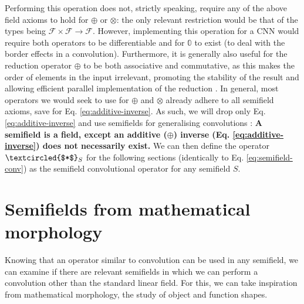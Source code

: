 \documentclass[a4paper, 12pt]{report}
\begin{document}
Performing this operation does not, strictly speaking, require any of the above field axioms to hold for $\oplus$ or $\otimes$: the only relevant restriction would be that of the types being $\mathcal{F}\times\mathcal{F}\rightarrow\mathcal{F}$. However, implementing this operation for a CNN would require both operators to be differentiable and for $\mathbb{0}$ to exist (to deal with the border effects in a convolution). Furthermore, it is generally also useful for the reduction operator $\oplus$ to be both associative and commutative, as this makes the order of elements in the input irrelevant, promoting the stability of the result and allowing efficient parallel implementation of the reduction \cite{ppad}. In general, most operators we would seek to use for $\oplus$ and $\otimes$ already adhere to all semifield axioms, save for Eq. \ref{eq:additive-inverse}. As such, we will drop only Eq. \ref{eq:additive-inverse} and use semifields for generalising convolutions \cite{bellaardaxiomatic}:
\textbf{A semifield is a field, except an additive ($\oplus$) inverse (Eq. \ref{eq:additive-inverse}) does not necessarily exist.}
We can then define the operator $\textcircled{$*$}_S$ for the following sections (identically to Eq. \ref{eq:semifield-conv}) as the semifield convolutional operator for any semifield $S$.

\section{Semifields from mathematical morphology}
Knowing that an operator similar to convolution can be used in any semifield, we can examine if there are relevant semifields in which we can perform a convolution other than the standard linear field. For this, we can take inspiration from mathematical morphology, the study of object and function shapes.
\end{document}
